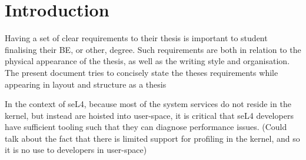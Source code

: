 \chapter{Introduction}\label{ch:intro}

Having a set of clear requirements to their thesis is important to student
finalising their BE, or other, degree.  Such requirements are both in
relation to the physical appearance of the thesis, as well as the writing
style and organisation.  The present document tries to concisely state the
theses requirements while appearing in layout and structure as a thesis

In the context of seL4, because most of the system services do not reside in the kernel, but instead are hoisted into user-space, it is critical that seL4 developers have sufficient tooling such that they can diagnose performance issues. (Could talk about the fact that there is limited support for profiling in the kernel, and so it is no use to developers in user-space)


